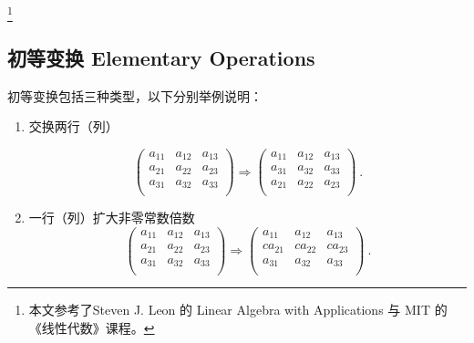 
\begin{issues}
\issueMissDepend
\end{issues}

\footnote{本文参考了Steven J. Leon 的 Linear Algebra with Applications 与 MIT 的《线性代数》课程。}

\subsection{初等变换 Elementary Operations}
初等变换包括三种类型，以下分别举例说明：

\begin{enumerate}
\item 交换两行（列）

\begin{equation}
\begin{pmatrix}
        a_{11} & a_{12} & a_{13}\\
        a_{21} & a_{22} & a_{23}\\
        a_{31} & a_{32} & a_{33}\\
\end{pmatrix}
\Rightarrow
\begin{pmatrix}
        a_{11} & a_{12} & a_{13}\\
        a_{31} & a_{32} & a_{33}\\
        a_{21} & a_{22} & a_{23}\\
\end{pmatrix}~.
\end{equation}

\item 一行（列）扩大非零常数倍数
\begin{equation}
\begin{pmatrix}
        a_{11} & a_{12} & a_{13}\\
        a_{21} & a_{22} & a_{23}\\
        a_{31} & a_{32} & a_{33}\\
\end{pmatrix}
\Rightarrow
\begin{pmatrix}
        a_{11} & a_{12} & a_{13}\\
        ca_{21} & ca_{22} & ca_{23}\\
        a_{31} & a_{32} & a_{33}\\
\end{pmatrix}~.
\end{equation}


\end{enumerate}
